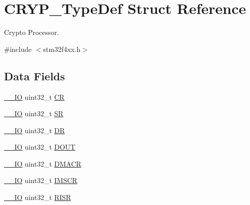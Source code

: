 \hypertarget{struct_c_r_y_p___type_def}{\section{C\-R\-Y\-P\-\_\-\-Type\-Def Struct Reference}
\label{struct_c_r_y_p___type_def}
}


Crypto Processor.  




{\ttfamily \#include $<$stm32f4xx.\-h$>$}

\subsection*{Data Fields}
\begin{DoxyCompactItemize}
\item 
\hyperlink{group___c_m_s_i_s__core__definitions_gaec43007d9998a0a0e01faede4133d6be}{\-\_\-\-\_\-\-I\-O} uint32\-\_\-t \hyperlink{struct_c_r_y_p___type_def_ab40c89c59391aaa9d9a8ec011dd0907a}{C\-R}
\item 
\hyperlink{group___c_m_s_i_s__core__definitions_gaec43007d9998a0a0e01faede4133d6be}{\-\_\-\-\_\-\-I\-O} uint32\-\_\-t \hyperlink{struct_c_r_y_p___type_def_af6aca2bbd40c0fb6df7c3aebe224a360}{S\-R}
\item 
\hyperlink{group___c_m_s_i_s__core__definitions_gaec43007d9998a0a0e01faede4133d6be}{\-\_\-\-\_\-\-I\-O} uint32\-\_\-t \hyperlink{struct_c_r_y_p___type_def_a3df0d8dfcd1ec958659ffe21eb64fa94}{D\-R}
\item 
\hyperlink{group___c_m_s_i_s__core__definitions_gaec43007d9998a0a0e01faede4133d6be}{\-\_\-\-\_\-\-I\-O} uint32\-\_\-t \hyperlink{struct_c_r_y_p___type_def_ab8ba768d1dac54a845084bd07f4ef2b9}{D\-O\-U\-T}
\item 
\hyperlink{group___c_m_s_i_s__core__definitions_gaec43007d9998a0a0e01faede4133d6be}{\-\_\-\-\_\-\-I\-O} uint32\-\_\-t \hyperlink{struct_c_r_y_p___type_def_a082219a924d748e9c6092582aec06226}{D\-M\-A\-C\-R}
\item 
\hyperlink{group___c_m_s_i_s__core__definitions_gaec43007d9998a0a0e01faede4133d6be}{\-\_\-\-\_\-\-I\-O} uint32\-\_\-t \hyperlink{struct_c_r_y_p___type_def_adcdd7c23a99f81c21dae2e9f989632e1}{I\-M\-S\-C\-R}
\item 
\hyperlink{group___c_m_s_i_s__core__definitions_gaec43007d9998a0a0e01faede4133d6be}{\-\_\-\-\_\-\-I\-O} uint32\-\_\-t \hyperlink{struct_c_r_y_p___type_def_aa196fddf0ba7d6e3ce29bdb04eb38b94}{R\-I\-S\-R}
\item 

\end{DoxyCompactItemize}
